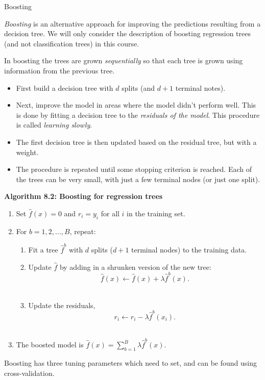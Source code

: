 \documentclass[ignorenonframetext,]{beamer}
\providecommand{\tightlist}{%
  \setlength{\itemsep}{0pt}\setlength{\parskip}{0pt}}
\begin{document}
\begin{frame}{Boosting}

\emph{Boosting} is an alternative approach for improving the predictions
resulting from a decision tree. We will only consider the description of
boosting regression trees (and not classification trees) in this course.

In boosting the trees are grown \emph{sequentially} so that each tree is
grown using information from the previous tree.

\begin{itemize}
\tightlist
\item
  First build a decision tree with \(d\) splits (and \(d+1\) terminal
  notes).
\item
  Next, improve the model in areas where the model didn't perform well.
  This is done by fitting a decision tree to the \emph{residuals of the
  model}. This procedure is called \emph{learning slowly}.
\item
  The first decision tree is then updated based on the residual tree,
  but with a weight.
\item
  The procedure is repeated until some stopping criterion is reached.
  Each of the trees can be very small, with just a few terminal nodes
  (or just one split).
\end{itemize}

\end{frame}

\begin{frame}

\textbf{Algorithm 8.2: Boosting for regression trees}

\begin{enumerate}
\def\labelenumi{\arabic{enumi}.}
\tightlist
\item
  Set \(\hat{f}(x) = 0\) and \(r_i = y_i\) for all \(i\) in the training
  set.
\item
  For \(b=1,2,...,B\), repeat:

  \begin{enumerate}
  \def\labelenumii{\alph{enumii})}
  \tightlist
  \item
    Fit a tree \(\hat{f}^b\) with \(d\) splits (\(d+1\) terminal nodes)
    to the training data.\\
  \item
    Update \(\hat{f}\) by adding in a shrunken version of the new tree:
    \[\hat{f}(x) \leftarrow \hat{f}(x)+\lambda \hat{f}^b(x).\]\\
  \item
    Update the residuals,
    \[r_i \leftarrow r_i - \lambda \hat{f}^b(x_i).\]\\
  \end{enumerate}
\item
  The boosted model is
  \(\hat{f}(x) = \sum_{b=1}^B \lambda \hat{f}^b(x).\)
\end{enumerate}

Boosting has three tuning parameters which need to set, and can be found
using cross-validation.

\end{frame}
\end{document}
